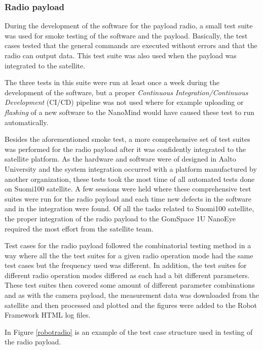 \documentclass[english,12pt,a4paper,pdftex,elec,utf8]{aaltothesis}
\begin{document}
\subsubsection{Radio payload}
During the development of the software for the payload radio, a small test suite was used for smoke testing of the software and the payload. Basically, the test cases tested that the general commands are executed without errors and that the radio can output data. This test suite was also used when the payload was integrated to the satellite.\par
The three tests in this suite were run at least once a week during the development of the software, but a proper \textit{Continuous Integration/Continuous Development} (CI/CD) pipeline was not used where for example uploading or \textit{flashing} of a new software to the NanoMind would have caused these test to run automatically.\par
Besides the aforementioned smoke test, a more comprehensive set of test suites was performed for the radio payload after it was confidently integrated to the satellite platform. As the hardware and software were of designed in Aalto University and the system integration occurred with a platform manufactured by another organization, these tests took the most time of all automated tests done on Suomi100 satellite. A few sessions were held where these comprehensive test suites were run for the radio payload and each time new defects in the software and in the integration were found. Of all the tasks related to Suomi100 satellite, the proper integration of the radio payload to the GomSpace 1U NanoEye required the most effort from the satellite team.\par
Test cases for the radio payload followed the combinatorial testing method in a way where all the the test suites for a given radio operation mode had the same test cases but the frequency used was different. In addition, the test suites for different radio operation modes differed as each had a bit different parameters. These test suites then covered some amount of different parameter combinations and as with the camera payload, the measurement data was downloaded from the satellite and then processed and plotted and the figures were added to the Robot Framework HTML log files.\par 
In Figure \ref{robotradio} is an example of the test case structure used in testing of the radio payload.\par 
\end{document}
